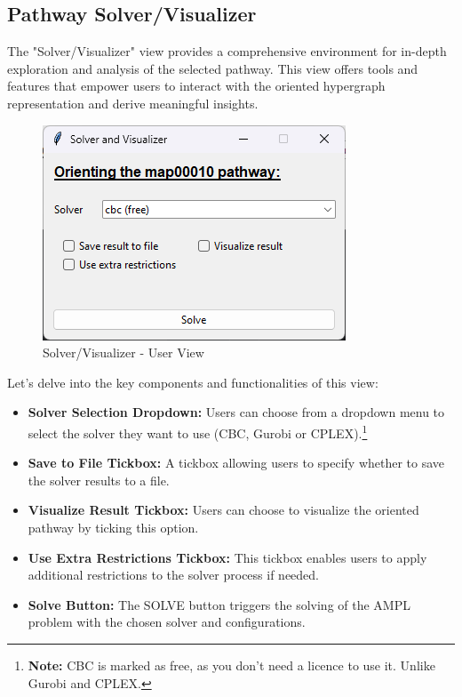 \subsection{Pathway Solver/Visualizer}

The "Solver/Visualizer" view provides a comprehensive environment for in-depth exploration and analysis of the selected pathway. This view offers tools and features that empower users to interact with the oriented hypergraph representation and derive meaningful insights. 

\begin{figure}[H]
    \centering
    \includegraphics{Design of the User Interface/solver_visualizer.png}
    \caption{Solver/Visualizer - User View}
    \label{fig:solver_visualizer}
\end{figure}

Let's delve into the key components and functionalities of this view:
\begin{itemize}
    \item \textbf{Solver Selection Dropdown:} Users can choose from a dropdown menu to select the solver they want to use (CBC, Gurobi or CPLEX).\footnote{\textbf{Note:} CBC is marked as free, as you don't need a licence to use it. Unlike Gurobi and CPLEX.}
    \item \textbf{Save to File Tickbox:} A tickbox allowing users to specify whether to save the solver results to a file.
    \item \textbf{Visualize Result Tickbox:} Users can choose to visualize the oriented pathway by ticking this option.
    \item \textbf{Use Extra Restrictions Tickbox:} This tickbox enables users to apply additional restrictions to the solver process if needed.
    \item \textbf{Solve Button:} The SOLVE button triggers the solving of the AMPL problem with the chosen solver and configurations.
\end{itemize}

